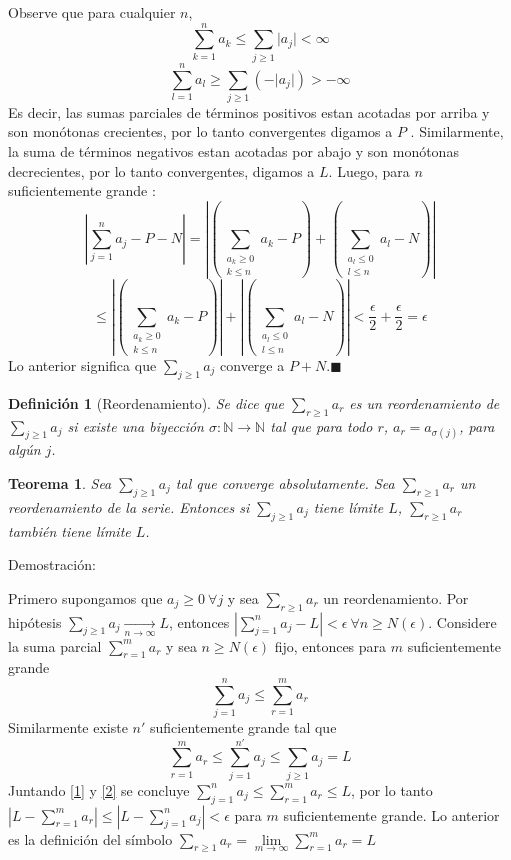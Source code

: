 \documentclass[12pt]{book}
\newcommand\N{{\mathbb N}}
\providecommand{\abs}[1]{\lvert#1\rvert}
\newtheorem{teo}{Teorema}[section]
\newtheorem{defi}{Definición}[section]
\begin{document}
Observe que para cualquier $n$, $$\sum_{k=1}^n a_k \le \sum_{j \ge 1}\abs{a_j} < \infty$$
$$\sum_{l=1}^n a_l \ge \sum_{j \ge 1}(-\abs{a_j}) > -\infty$$
Es decir, las sumas parciales de términos positivos estan acotadas por arriba y son monótonas crecientes, por lo tanto convergentes digamos a $P$ . Similarmente, la suma de términos negativos estan acotadas por abajo y son monótonas decrecientes, por lo tanto convergentes, digamos a $L$. Luego, para $n$ suficientemente grande : $$\left| \sum_{j=1}^na_j -P-N \right|=\left| \left( \sum_{\substack{a_k \ge 0\\k \le n}}a_k-P \right) + \left( \sum_{\substack{a_l \le 0\\l \le n}}a_l-N \right) \right|$$
$$\le \left| \left( \sum_{\substack{a_k \ge 0\\k \le n}}a_k-P \right) \right| + \left| \left( \sum_{\substack{a_l \le 0\\l \le n}}a_l-N \right) \right| <\frac{\epsilon}{2}+\frac{\epsilon}{2}=\epsilon$$
Lo anterior significa que $\sum_{j \ge 1}a_j$ converge a $P+N$.$\blacksquare$
\begin{defi}[Reordenamiento]\rm
Se dice que $\sum_{r \ge 1}a_r$ es un reordenamiento de $\sum_{j  \ge 1}a_j$ si existe una biyección $\sigma :\N \to \N$ tal que para todo $r$, $a_r=a_{\sigma(j)}$, para algún $j$.
\end{defi}
\begin{teo}\label{TeoReordenamiento}\rm
Sea $\sum_{j \ge 1}a_j$ tal que converge absolutamente. Sea $\sum_{r \ge 1}a_r$ un reordenamiento de la serie. Entonces si $\sum_{j \ge 1}a_j$ tiene límite $L$, $\sum_{r \ge 1}a_r$ también tiene límite $L$.
\end{teo}
Demostración:

Primero supongamos que $a_j \ge 0 \ \forall{j}$ y sea $\sum_{r \ge 1}a_r$ un reordenamiento. Por hipótesis $\sum_{j \ge 1}a_j\xrightarrow[n \to \infty]\,{L}$, entonces $\left| \sum_{j=1}^na_j-L \right| < \epsilon \ \forall{n \ge N(\epsilon)}$. Considere la suma parcial $\sum_{r=1}^ma_r$ y sea $n \ge N(\epsilon)$ fijo, entonces para $m$ suficientemente grande
\begin{equation}
 \sum_{j=1}^na_j \le \sum_{r=1}^ma_r \label{1}   
\end{equation}
Similarmente existe $n'$ suficientemente grande tal que 
\begin{equation}
    \sum_{r=1}^{m}a_r \le \sum_{j=1}^{n'}a_j \le \sum_{j \ge 1}a_j=L \label{2}
\end{equation}
Juntando \ref{1} y \ref{2} se concluye $\sum_{j=1}^{n}a_j \le \sum_{r=1}^{m}a_r \le L$, por lo tanto $\left| L-\sum_{r=1}^{m}a_r \right| \le \left| L-\sum_{j=1}^{n}a_j \right|< \epsilon$ para $m$ suficientemente grande. Lo anterior es la definición del símbolo $\sum_{r \ge 1}a_r=\lim\limits_{m \to \infty} \sum_{r=1}^{m}a_r=L$
\end{document}
